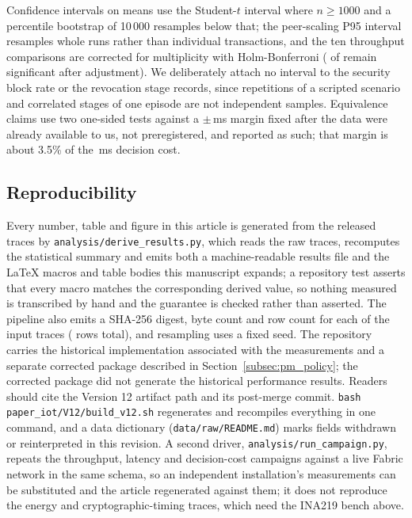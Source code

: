\documentclass[a4paper,fleqn]{cas-sc}
\begin{document}
Confidence intervals on means use the Student-$t$ interval where
$n \ge 1000$ and a percentile bootstrap of 10\,000 resamples below that;
the peer-scaling P95 interval resamples whole runs rather than individual
transactions, and the ten throughput comparisons are corrected for
multiplicity with Holm-Bonferroni (\OverheadHolmSig{} of \OverheadLevels{}
remain significant after adjustment). We deliberately attach no interval
to the security block rate or the revocation stage records, since
repetitions of a scripted scenario and correlated stages of one episode
are not independent samples. Equivalence claims use two one-sided tests
against a $\pm$\DecisionMargin\,ms margin fixed after the data were
already available to us, not preregistered, and reported as such; that
margin is about 3.5\% of the \DecisionMean\,ms decision cost.

\subsection{Reproducibility}
\label{subsec:repro}

Every number, table and figure in this article is generated from the
released traces by \texttt{analysis/derive\_results.py}, which reads the
raw traces, recomputes the statistical summary and emits both a
machine-readable results file and the LaTeX macros and table bodies this
manuscript expands; a repository test asserts that every macro matches the
corresponding derived value, so nothing measured is transcribed by hand
and the guarantee is checked rather than asserted. The pipeline also emits
a SHA-256 digest, byte count and row count for each of the \TraceCount{}
input traces (\TraceRows{} rows total), and resampling uses a fixed seed.
The repository carries the historical implementation associated with the
measurements and a separate corrected package described in
Section~\ref{subsec:pm_policy}; the corrected package did not generate the
historical performance results. Readers should cite the Version 12 artifact
path and its post-merge commit. \texttt{bash
paper\_iot/V12/build\_v12.sh} regenerates and recompiles everything in one
command, and a data dictionary (\texttt{data/raw/README.md}) marks fields
withdrawn or reinterpreted in this revision. A second driver,
\texttt{analysis/run\_campaign.py}, repeats the throughput, latency and
decision-cost campaigns against a live Fabric network in the same schema,
so an independent installation's measurements can be substituted and the
article regenerated against them; it does not reproduce the energy and
cryptographic-timing traces, which need the INA219 bench above.
\end{document}
